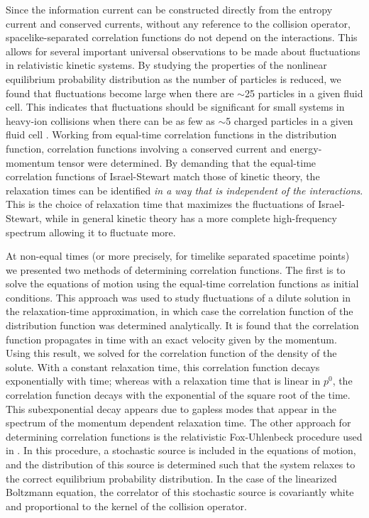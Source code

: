 \documentclass[aps,prd,preprint,nofootinbib,amsmath,amssymb,showpacs,longbibliography,singlecolumn,superscriptaddress,10pt]{revtex4-1}
\theoremstyle{plain}
\theoremstyle{definition}
\begin{document}
Since the information current can be constructed directly from the entropy current and conserved currents, without any reference to the collision operator, spacelike-separated correlation functions do not depend on the interactions. This allows for several important universal observations to be made about fluctuations in relativistic kinetic systems. By studying the properties of the nonlinear equilibrium probability distribution as the number of particles is reduced, we found that fluctuations become large when there are $\sim$25 particles in a given fluid cell. This indicates that fluctuations should be significant for small systems in heavy-ion collisions when there can be as few as $\sim$5 charged particles in a given fluid cell \cite{Noronha:2024dtq}. Working from equal-time correlation functions in the distribution function, correlation functions involving a conserved current and energy-momentum tensor were determined. By demanding that the equal-time correlation functions of Israel-Stewart match those of kinetic theory, the relaxation times can be identified \emph{in a way that is independent of the interactions}. This is the choice of relaxation time that maximizes the fluctuations of Israel-Stewart, while in general kinetic theory has a more complete high-frequency spectrum allowing it to fluctuate more. 

At non-equal times (or more precisely, for timelike separated spacetime points) we presented two methods of determining correlation functions. The first is to solve the equations of motion using the equal-time correlation functions as initial conditions. This approach was used to study fluctuations of a dilute solution in the relaxation-time approximation, in which case the correlation function of the distribution function was determined analytically. It is found that the correlation function propagates in time with an exact velocity given by the momentum. Using this result, we solved for the correlation function of the density of the solute. With a constant relaxation time, this correlation function decays exponentially with time; whereas with a relaxation time that is linear in $p^0$, the correlation function decays with the exponential of the square root of the time. This subexponential decay appears due to gapless modes that appear in the spectrum of the momentum dependent relaxation time. The other approach for determining correlation functions is the relativistic Fox-Uhlenbeck procedure used in \cite{Mullins:2023tjg, Mullins:2023ott, Gavassino:2024vyu}. In this procedure, a stochastic source is included in the equations of motion, and the distribution of this source is determined such that the system relaxes to the correct equilibrium probability distribution. In the case of the linearized Boltzmann equation, the correlator of this stochastic source is covariantly white and proportional to the kernel of the collision operator.
\end{document}
